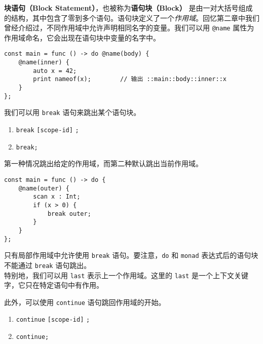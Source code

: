 \textbf{块语句（Block Statement）}，也被称为\textbf{语句块（Block）} 是由一对大括号组成的结构，其中包含了零到多个语句。语句块定义了一个\emph{作用域}。回忆第二章中我们曾经介绍过，不同作用域中允许声明相同名字的变量。我们可以用 \lstinline!@name! 属性为作用域命名，它会出现在语句块中变量的名字中。

\begin{lstlisting}
const main = func () -> do @name(body) {
    @name(inner) {
        auto x = 42;
        print nameof(x);		// 输出 ::main::body::inner::x
    }
};
\end{lstlisting}

我们可以用 \lstinline!break! 语句来跳出某个语句块。

\begin{grammar} \label{grm:break-statement}
\begin{enumerate}
	\item \lstinline!break! \texttt{[scope-id]} \lstinline!;!
	\item \lstinline!break;!
\end{enumerate}
\end{grammar}

第一种情况跳出给定的作用域，而第二种默认跳出当前作用域。

\begin{lstlisting}
const main = func () -> do {
    @name(outer) {
        scan x : Int;
        if (x > 0) {
            break outer;
        }
    }
};
\end{lstlisting}

只有局部作用域中允许使用 \lstinline!break! 语句。要注意，\lstinline!do! 和 \lstinline!monad! 表达式后的语句块不能通过 \lstinline!break! 语句跳出。 \\

特别地，我们可以用 \lstinline!last! 表示上一个作用域。这里的 \lstinline!last! 是一个上下文关键字，它只在特定语句中有作用。

此外，可以使用 \lstinline!continue! 语句跳回作用域的开始。

\begin{grammar} \label{grm:continue-statement}
\begin{enumerate}
	\item \lstinline!continue! \texttt{[scope-id]} \lstinline!;!
	\item \lstinline!continue;!
\end{enumerate}
\end{grammar}

